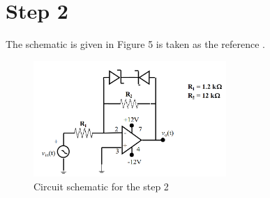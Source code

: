\documentclass[letterpaper,12pt]{article}
\begin{document}
\section{Step 2}
The schematic is given in Figure 5 is taken as the reference .
\begin{figure}[H]
    \centering
    \includegraphics[width=0.65\textwidth]{2SCH.png}
\caption{Circuit schematic for the step 2}
\end{figure} 
\end{document}

